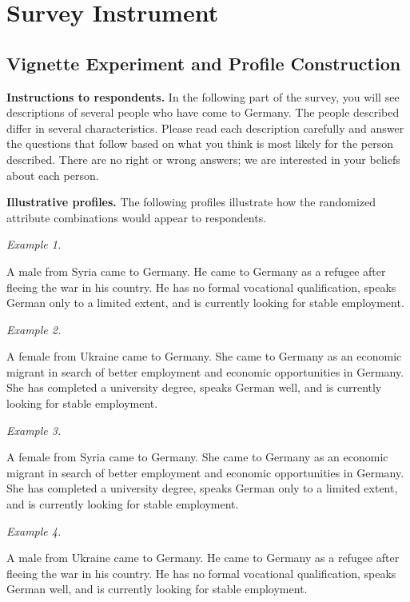 \section{Survey Instrument}

\subsection{Vignette Experiment and Profile Construction}

\noindent\textbf{Instructions to respondents.} In the following part of the survey, you will see descriptions of several people who
have come to Germany. The people described differ in several characteristics. Please
read each description carefully and answer the questions that follow based on what you
think is most likely for the person described. There are no right or wrong answers; we
are interested in your beliefs about each person.\medskip

\noindent\textbf{Illustrative profiles.} The following profiles illustrate how the randomized attribute combinations would
appear to respondents.

\medskip

\noindent\textit{Example 1.}

\noindent
A male from Syria came to Germany. He came to Germany as a refugee after fleeing
the war in his country. He has no formal vocational qualification, speaks German only
to a limited extent, and is currently looking for stable employment.

\medskip

\noindent\textit{Example 2.}

\noindent
A female from Ukraine came to Germany. She came to Germany as an economic migrant
in search of better employment and economic opportunities in Germany. She has
completed a university degree, speaks German well, and is currently looking for stable
employment.

\medskip

\noindent\textit{Example 3.}

\noindent
A female from Syria came to Germany. She came to Germany as an economic migrant
in search of better employment and economic opportunities in Germany. She has
completed a university degree, speaks German only to a limited extent, and is currently
looking for stable employment.

\medskip

\noindent\textit{Example 4.}

\noindent
A male from Ukraine came to Germany. He came to Germany as a refugee after fleeing
the war in his country. He has no formal vocational qualification, speaks German well,
and is currently looking for stable employment.


